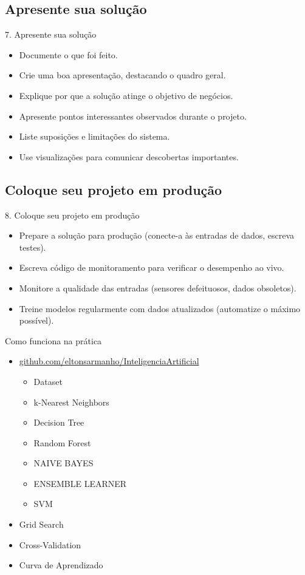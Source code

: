 \documentclass{beamer}
\begin{document}
\subsection{Apresente sua solução}
\begin{frame}{7. Apresente sua solução}
    \begin{itemize}
        \item Documente o que foi feito.
        \item Crie uma boa apresentação, destacando o quadro geral.
        \item Explique por que a solução atinge o objetivo de negócios.
        \item Apresente pontos interessantes observados durante o projeto.
        \item Liste suposições e limitações do sistema.
        \item Use visualizações para comunicar descobertas importantes.
    \end{itemize}
\end{frame}

\subsection{Coloque seu projeto em produção}
\begin{frame}{8. Coloque seu projeto em produção}
    \begin{itemize}
        \item Prepare a solução para produção (conecte-a às entradas de dados, escreva testes).
        \item Escreva código de monitoramento para verificar o desempenho ao vivo.
        \item Monitore a qualidade das entradas (sensores defeituosos, dados obsoletos).
        \item Treine modelos regularmente com dados atualizados (automatize o máximo possível).
    \end{itemize}
\end{frame}

\begin{frame}{Como funciona na prática}
    \begin{itemize}
        \item \url{github.com/eltonsarmanho/InteligenciaArtificial}
        \begin{itemize}
         \item Dataset
         \item k-Nearest Neighbors
         \item Decision Tree
         \item Random Forest
         \item NAIVE BAYES
         \item ENSEMBLE LEARNER
         \item SVM
        \end{itemize}
\item  Grid Search
\item Cross-Validation
\item Curva de Aprendizado
    \end{itemize}
\end{frame}
\end{document}
